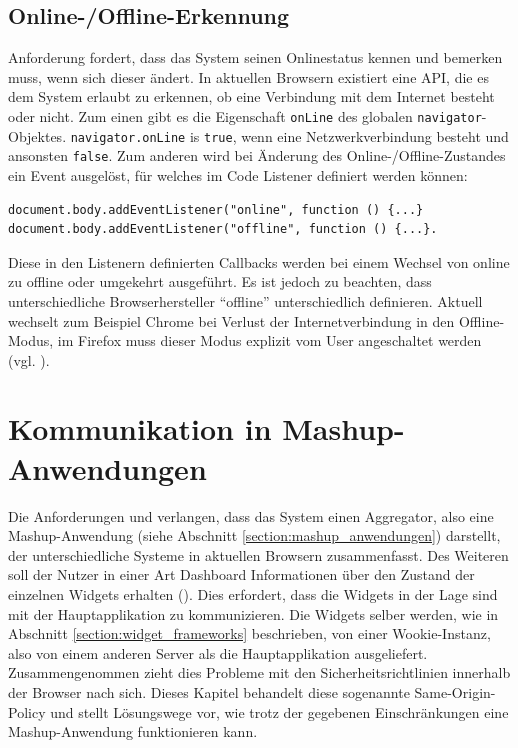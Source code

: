 \subsection{Online-/Offline-Erkennung}\label{section:online_offline_erkennung}
Anforderung  fordert, dass das System seinen Onlinestatus kennen und bemerken muss, wenn sich dieser ändert. In aktuellen Browsern existiert eine API, die es dem System erlaubt zu erkennen, ob eine Verbindung mit dem Internet besteht oder nicht. Zum einen gibt es die Eigenschaft \texttt{onLine} des globalen \texttt{navigator}-Objektes. \texttt{navigator.onLine} is \texttt{true}, wenn eine Netzwerkverbindung besteht und ansonsten \texttt{false}. Zum anderen wird bei Änderung des Online-/Offline-Zustandes ein Event ausgelöst, für welches im Code Listener definiert werden können:
\begin{lstlisting}
document.body.addEventListener("online", function () {...} 
document.body.addEventListener("offline", function () {...}.
\end{lstlisting}          
Diese in den Listenern definierten Callbacks werden bei einem Wechsel von online zu offline oder umgekehrt ausgeführt. Es ist jedoch zu beachten, dass unterschiedliche Browserhersteller "`offline"' unterschiedlich definieren. Aktuell wechselt zum Beispiel Chrome bei Verlust der Internetverbindung in den Offline-Modus, im Firefox muss dieser Modus explizit vom User angeschaltet werden (vgl. \cite{MozBug2011}).

\section{Kommunikation in Mashup-Anwendungen}\label{section:kommunikation_in_mashup_anwendungen}
Die Anforderungen  und  verlangen, dass das System einen Aggregator, also eine Mashup-Anwendung (siehe Abschnitt \ref{section:mashup_anwendungen}) darstellt, der unterschiedliche Systeme in aktuellen Browsern zusammenfasst. Des Weiteren soll der Nutzer in einer Art Dashboard Informationen über den Zustand der einzelnen Widgets erhalten (). Dies erfordert, dass die Widgets in der Lage sind mit der Hauptapplikation zu kommunizieren. Die Widgets selber werden, wie in Abschnitt \ref{section:widget_frameworks} beschrieben, von einer Wookie-Instanz, also von einem anderen Server als die Hauptapplikation ausgeliefert. Zusammengenommen zieht dies Probleme mit den Sicherheitsrichtlinien innerhalb der Browser nach sich. Dieses Kapitel behandelt diese sogenannte Same-Origin-Policy und stellt Lösungswege vor, wie trotz der gegebenen Einschränkungen eine Mashup-Anwendung funktionieren kann.

